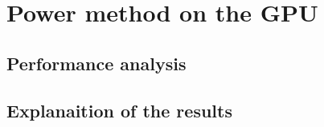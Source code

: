 \section{Power method on the GPU}

\subsection{Performance analysis} 






\subsection{Explanaition of the results}
